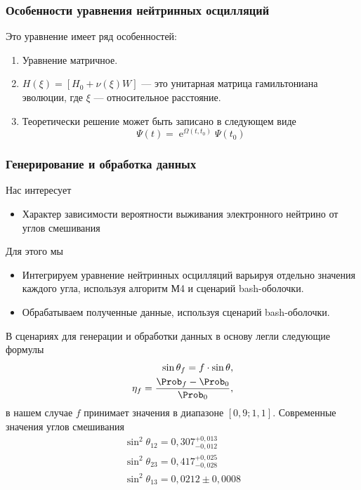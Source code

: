 \documentclass[utf8,9pt,mathserif,usepdftitle=false]{beamer}
\renewcommand{\exp}{\operatorname{e}}
\begin{document}
\begin{frame}
	\frametitle{Особенности уравнения нейтринных осцилляций}%
  Это уравнение имеет ряд особенностей:
  \begin{enumerate}
  \item<2-> Уравнение матричное.
  \item<3-> \(H(\xi)=[H_{0}+\nu(\xi)W]\) — это унитарная матрица гамильтониана
    эволюции, где \(\xi\) --- относительное расстояние.
  \item<4-> Теоретически решение может быть записано в следующем виде
    \begin{equation}
    	\Psi(t)=\exp^{\Omega(t,t_{0})}\Psi(t_{0})
    \end{equation}
  \end{enumerate}
\end{frame}

\begin{frame}
	\frametitle{Генерирование и обработка данных}%
	Нас интересует
	\begin{itemize}
		\item<2-> Характер зависимости вероятности выживания электронного нейтрино от 
		углов смешивания
	\end{itemize}
	Для этого мы
	\begin{itemize}
		\item<4-> Интегрируем уравнение нейтринных осцилляций варьируя отдельно значения 
		каждого угла, используя алгоритм М4 и сценарий bash-оболочки.
		\item<5-> Обрабатываем полученные данные, используя сценарий bash-оболочки.
	\end{itemize}
	\onslide<6->%
	 В сценариях для генерации и обработки данных в основу легли следующие формулы
	\begin{align*}
		\sin{\theta_{f}}=f\cdot\sin{\theta},\\
		\eta_{f}=\frac{\Prob_{f}-\Prob_{0}}{\Prob_{0}},
	\end{align*}
	в нашем случае \(f\) принимает значения в диапазоне \([0,9;1,1]\).
 Современные значения углов смешивания
 \begin{align*}
 	\sin^{2}{\theta_{12}}=0,307_{-0,012}^{+0,013}\\
 	\sin^{2}{\theta_{23}}=0,417_{-0,028}^{+0,025}\\
 	\sin^{2}{\theta_{13}}=0,0212\pm 0,0008
 \end{align*}
  
\end{frame}
\end{document}
